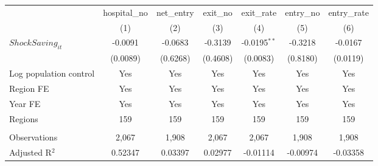 \begingroup
\centering
\begin{tabular}{lcccccc}
   \toprule
                          & hospital\_no  & net\_entry  & exit\_no  & exit\_rate     & entry\_no  & entry\_rate \\    
                          & (1)           & (2)         & (3)       & (4)            & (5)        & (6)\\  
   \midrule 
   $ShockSaving_{it}$     & -0.0091       & -0.0683     & -0.3139   & -0.0195$^{**}$ & -0.3218    & -0.0167\\   
                          & (0.0089)      & (0.6268)    & (0.4608)  & (0.0083)       & (0.8180)   & (0.0119)\\   
   Log population control & Yes           & Yes         & Yes       & Yes            & Yes        & Yes\\  
   Region FE              & Yes           & Yes         & Yes       & Yes            & Yes        & Yes\\  
   Year FE                & Yes           & Yes         & Yes       & Yes            & Yes        & Yes\\  
   Regions                & 159           & 159         & 159       & 159            & 159        & 159\\  
    \\
   Observations           & 2,067         & 1,908       & 2,067     & 2,067          & 1,908      & 1,908\\  
   Adjusted R$^2$         & 0.52347       & 0.03397     & 0.02977   & -0.01114       & -0.00974   & -0.03358\\  
   \bottomrule
\end{tabular}
\par\endgroup
